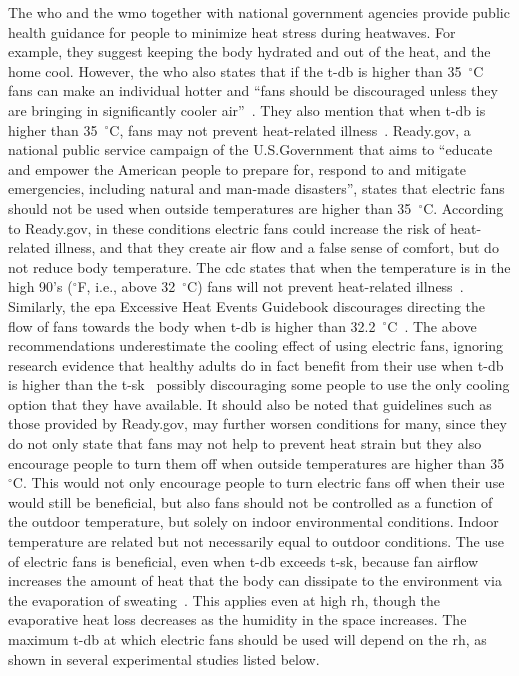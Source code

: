 The \ac{who} and the \ac{wmo} together with national government agencies provide public health guidance for people to minimize heat stress during heatwaves.
For example, they suggest keeping the body hydrated and out of the heat, and the home cool.
However, the \ac{who} also states that if the \ac{t-db} is higher than 35~$^{\circ}$C fans can make an individual hotter and ``fans should be discouraged unless they are bringing in significantly cooler air''~\cite{WMO2015}.
They also mention that when \ac{t-db} is higher than 35~$^{\circ}$C, fans may not prevent heat-related illness~\cite{HeatandH28:online}.
Ready.gov, a national public service campaign of the U.S.\@ Government that aims to ``educate and empower the American people to prepare for, respond to and mitigate emergencies, including natural and man-made disasters'', states that electric fans should not be used when outside temperatures are higher than 35~$^{\circ}$C\@.
According to Ready.gov, in these conditions electric fans could increase the risk of heat-related illness, and that they create air flow and a false sense of comfort, but do not reduce body temperature.
The \ac{cdc} states that when the temperature is in the high 90's ($^{\circ}$F, i.e., above 32~$^{\circ}$C) fans will not prevent heat-related illness~\cite{ExtremeH66:online}.
Similarly, the \ac{epa} Excessive Heat Events Guidebook discourages directing the flow of fans towards the body when \ac{t-db} is higher than 32.2~$^{\circ}$C~\cite{UnitedStatesEnvironmentalProtectionAgency2006}.
The above recommendations underestimate the cooling effect of using electric fans, ignoring research evidence that healthy adults do in fact benefit from their use when \ac{t-db} is higher than the \ac{t-sk}~\cite{Rate2015, Jay2015, Jay2019a, Rate2015, Gagnon2017} possibly discouraging some people to use the only cooling option that they have available.
It should also be noted that guidelines such as those provided by Ready.gov, may further worsen conditions for many, since they do not only state that fans may not help to prevent heat strain but they also encourage people to turn them off when outside temperatures are higher than 35~$^{\circ}$C\@.
This would not only encourage people to turn electric fans off when their use would still be beneficial, but also fans should not be controlled as a function of the outdoor temperature, but solely on indoor environmental conditions. 
Indoor temperature are related but not necessarily equal to outdoor conditions. 
The use of electric fans is beneficial, even when \ac{t-db} exceeds \ac{t-sk}, because fan airflow increases the amount of heat that the body can dissipate to the environment via the evaporation of sweating~\cite{Jay2015}.
This applies even at high \ac{rh}, though the evaporative heat loss decreases as the humidity in the space increases.
The maximum \ac{t-db} at which electric fans should be used will depend on the \ac{rh}, as shown in several experimental studies listed below.

